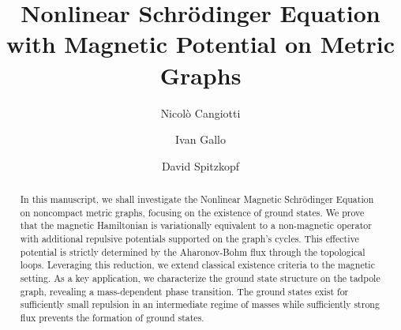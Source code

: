 \documentclass[12pt,a4paper]{amsart}
\theoremstyle{definition}
\theoremstyle{plain}
\numberwithin{equation}{section}
\begin{document}
\title[NLSE with Magnetic Potential on Metric Graphs]{Nonlinear Schr\"odinger Equation \\ with Magnetic Potential on Metric Graphs}

\author[N.\,Cangiotti]{Nicol\`o Cangiotti}
\author[I.\,Gallo]{Ivan Gallo}
\author[D.\,Spitzkopf]{David Spitzkopf}



\address[N.\,Cangiotti]{Department of Mathematics\newline\indent Politecnico di Milano \newline\indent
via Bonardi 9, Campus Leonardo, 20133 Milan, Italy}


\address[I.\,Gallo]{Dipartimento di Scienze Matematiche ``G.L. Lagrange'',\newline\indent Politecnico di Torino \newline\indent
Corso Duca degli Abruzzi, 24, 10129 Torino, Italy}
\address[D.\,Spitzkopf]{Department of Theoretical Physics, NPI, Academy of Sciences, \newline{} \v{R}e\v{z} near Prague, Czechia and Faculty of Mathematics and
Physics, \newline\indent Charles University, V Hole\v{s}ovi\v{c}k\'ach 2, 18000 Prague, Czechia}




\begin{abstract}
In this manuscript, we shall investigate the Nonlinear Magnetic Schrödinger Equation on noncompact metric graphs, focusing on the existence of ground states. We prove that the magnetic Hamiltonian is variationally equivalent to a non-magnetic operator with additional repulsive potentials supported on the graph's cycles. This effective potential is strictly determined by the Aharonov-Bohm flux through the topological loops. Leveraging this reduction, we extend classical existence criteria to the magnetic setting. As a key application, we characterize the ground state structure on the tadpole graph, revealing a mass-dependent phase transition. The ground states exist for sufficiently small repulsion in an intermediate regime of masses while sufficiently strong flux prevents the formation of ground states. 
\end{abstract}
\end{document}
